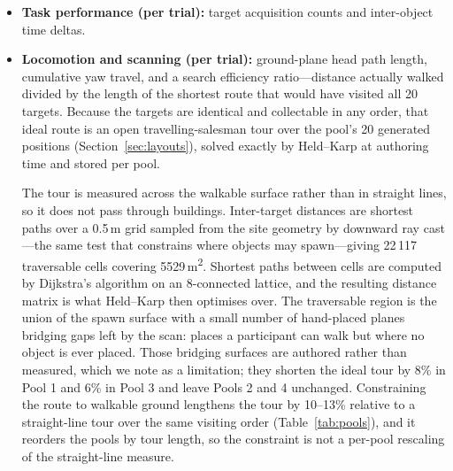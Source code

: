 \begin{itemize}
  \item \textbf{Task performance (per trial):} target acquisition counts and
    inter-object time deltas.
  \item \textbf{Locomotion and scanning (per trial):} ground-plane head path
    length, cumulative yaw travel, and a search efficiency ratio---distance
    actually walked divided by the length of the shortest route that would
    have visited all 20 targets. Because the targets are identical and
    collectable in any order, that ideal route is an open travelling-salesman
    tour over the pool's 20 generated positions (Section~\ref{sec:layouts}),
    solved exactly by Held--Karp at authoring time and stored per pool.

    The tour is measured across the walkable surface rather than in straight
    lines, so it does not pass through buildings. Inter-target distances are
    shortest paths over a 0.5\,m grid sampled from the site geometry by
    downward ray cast---the same test that constrains where objects may
    spawn---giving 22\,117 traversable cells covering
    5529\,m\textsuperscript{2}. Shortest paths between cells are computed by
    Dijkstra's algorithm on an 8-connected lattice, and the resulting distance
    matrix is what Held--Karp then optimises over. The traversable region is
    the union of the spawn surface with a small number of hand-placed planes
    bridging gaps left by the scan: places a participant can walk but where no
    object is ever placed. Those bridging surfaces are authored rather than
    measured, which we note as a limitation; they shorten the ideal tour by
    8\% in Pool 1 and 6\% in Pool 3 and leave Pools 2 and 4 unchanged.
    Constraining the route to walkable ground lengthens the tour by 10--13\%
    relative to a straight-line tour over the same visiting order
    (Table~\ref{tab:pools}), and it reorders the pools by tour length, so the
    constraint is not a per-pool rescaling of the straight-line measure.


\end{itemize}
